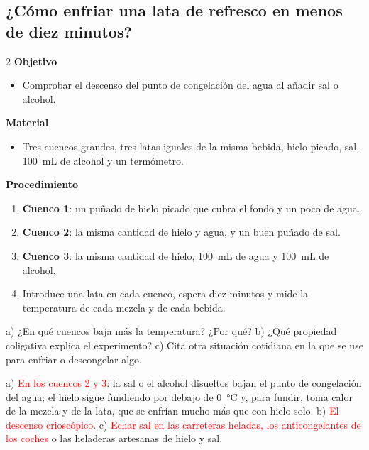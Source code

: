 \subsection{¿Cómo enfriar una lata de refresco en menos de diez minutos?}

\begin{multicols}{2}
    \textbf{Objetivo}
    \begin{itemize}
        \item Comprobar el descenso del punto de congelación del agua al añadir sal o alcohol.
    \end{itemize}
    \columnbreak
    \textbf{Material}
    \begin{itemize}
        \item Tres cuencos grandes, tres latas iguales de la misma bebida, hielo picado, sal, \qty{100}{\mL} de alcohol y un
        termómetro.
    \end{itemize}
\end{multicols}

\textbf{Procedimiento}
\begin{enumerate}[label=\numberballgreen]
    \item \textbf{Cuenco 1}: un puñado de hielo picado que cubra el fondo y un poco de agua.
    \item \textbf{Cuenco 2}: la misma cantidad de hielo y agua, y un buen puñado de sal.
    \item \textbf{Cuenco 3}: la misma cantidad de hielo, \qty{100}{\mL} de agua y \qty{100}{\mL} de alcohol.
    \item Introduce una lata en cada cuenco, espera diez minutos y mide la temperatura de cada mezcla y de cada bebida.
\end{enumerate}

\begin{exercise}
    a) ¿En qué cuencos baja más la temperatura? ¿Por qué? b) ¿Qué propiedad coligativa explica el experimento? c) Cita otra
    situación cotidiana en la que se use para enfriar o descongelar algo.
    \begin{solu}
        a) \textcolor{red}{En los cuencos 2 y 3}: la sal o el alcohol disueltos bajan el punto de congelación del agua; el hielo
        sigue fundiendo por debajo de \qty{0}{\degreeCelsius} y, para fundir, toma calor de la mezcla y de la lata, que se enfrían
        mucho más que con hielo solo. b) \textcolor{red}{El descenso crioscópico}. c) \textcolor{red}{Echar sal en las carreteras
        heladas, los anticongelantes de los coches} o las heladeras artesanas de hielo y sal.
    \end{solu}
\end{exercise}

